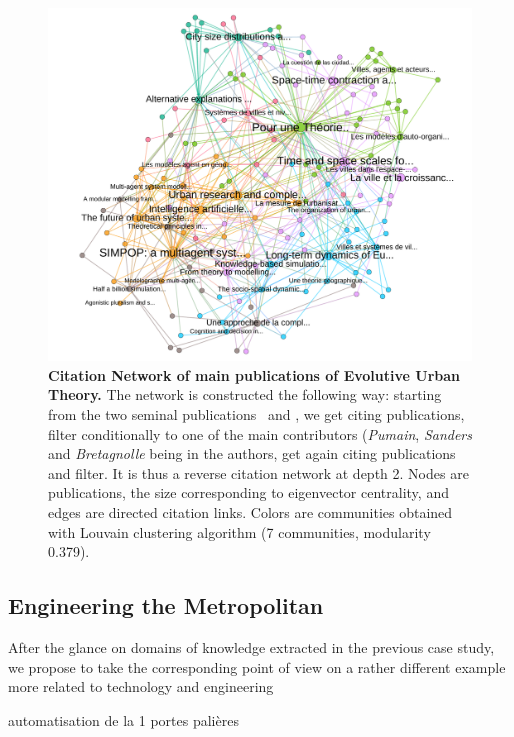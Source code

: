 \documentclass[runningheads,a4paper]{llncs2e/llncs}
\begin{document}
\begin{figure}
\hspace{-4cm}
\includegraphics[width=1.5\textwidth]{figures/core}
\caption{\textbf{Citation Network of main publications of Evolutive Urban Theory.} The network is constructed the following way: starting from the two seminal publications~\cite{pumain1997pour} and \cite{sanders1997simpop}, we get citing publications, filter conditionally to one of the main contributors (\emph{Pumain}, \emph{Sanders} and \emph{Bretagnolle} being in the authors, get again citing publications and filter. It is thus a reverse citation network at depth 2. Nodes are publications, the size corresponding to eigenvector centrality, and edges are directed citation links. Colors are communities obtained with Louvain clustering algorithm (7 communities, modularity 0.379).}
\label{fig:citnw}
\end{figure}




\subsection{Engineering the Metropolitan}

After the glance on domains of knowledge extracted in the previous case study, we propose to take the corresponding point of view on a rather different example more related to technology and engineering


\cite{belmonte2008automatisation} automatisation de la 1 \cite{foot2005faut} portes palières
\end{document}
